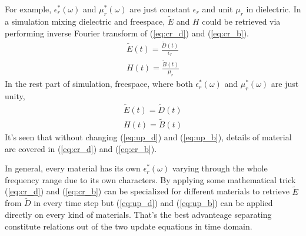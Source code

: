 For example, $\epsilon_r^*(\omega)$ and $\mu_r^*(\omega)$ are just constant $\epsilon_r$ and unit $\mu_r$ in
dielectric. In a simulation mixing dielectric and freespace, $\widetilde{E}$ and $H$ could be retrieved via performing
inverse Fourier transform of (\ref{eq:cr_d}) and (\ref{eq:cr_b}).
\begin{gather*}
  \widetilde{E}(t) = \frac{\widetilde{D}(t)}{\epsilon_r}\\
  H(t) = \frac{\widetilde{B}(t)}{\mu_r}
\end{gather*}
In the rest part of simulation, freespace, where both $\epsilon_r^*(\omega)$ and $\mu_r^*(\omega)$ are just unity, 
\begin{gather*}
  \widetilde{E}(t) = \widetilde{D}(t)\\
  H(t) = \widetilde{B}(t)
\end{gather*}
It's seen that without changing (\ref{eq:up_d}) and (\ref{eq:up_b}), details of material are covered in (\ref{eq:cr_d}) and
(\ref{eq:cr_b}).

In general, every material has its own $\epsilon_r^*(\omega)$ varying through the whole frequency range due to its own
characters. By applying some mathematical trick (\ref{eq:cr_d}) and (\ref{eq:cr_b}) can be specialized for different
materials to retrieve $\widetilde{E}$ from $\widetilde{D}$ in every time step but (\ref{eq:up_d}) and (\ref{eq:up_b}) can be
applied directly on every kind of materials. That's the best advanteage separating constitute relations out of the two
update equations in time domain.

